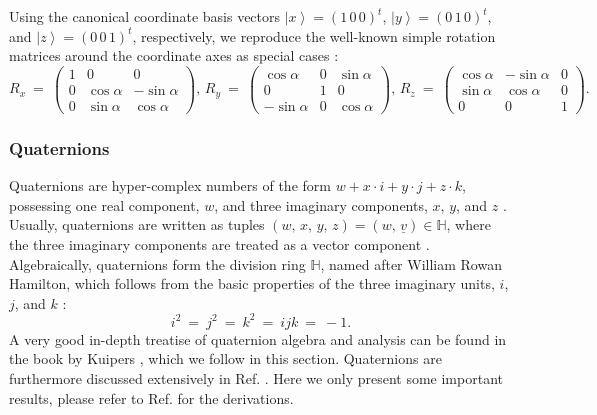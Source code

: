 Using the canonical coordinate basis vectors $\left| x \right> = \left( 1\,0\,0 \right)^t$, $\left| y \right> = \left( 0\,1\,0 \right)^t$,
and $\left| z \right> = \left( 0\,0\,1 \right)^t$, respectively, we reproduce the well-known simple rotation matrices around the
coordinate axes as special cases \cite[p. 238]{Bronstein2008}:
\begin{equation}
	R_x \ =\ 
		\left( \begin{array}{ccc} 
			1 &            0 &            0  \\
			0 &  \cos \alpha & -\sin \alpha  \\
			0 & \sin \alpha  &  \cos \alpha
		\end{array} \right),\,
	R_y \ =\ 
		\left( \begin{array}{ccc} 
			  \cos \alpha &         0 &  \sin \alpha \\
			           0  &         1 &            0 \\
			-\sin \alpha  &         0 &  \cos \alpha
		\end{array} \right),\,
	R_z \ =\ 
		\left( \begin{array}{ccc} 
			 \cos \alpha & -\sin \alpha &             0  \\
			\sin \alpha  &  \cos \alpha &             0  \\
			           0 &            0 &             1
		\end{array} \right).
\end{equation}


\subsubsection{Quaternions}
Quaternions are hyper-complex numbers of the form $w + x \cdot i + y \cdot j + z \cdot k$, possessing one real 
component, $w$, and three imaginary components, $x$, $y$, and $z$ \cite[pp. 294-295]{Bronstein2008}.
Usually, quaternions are written as tuples $\left( w,\,x,\,y,\,z \right) = \left( w,\,\underline{v} \right) \in \mathbb{H}$,
where the three imaginary components are treated as a vector component \cite[p. 295]{Bronstein2008}.
Algebraically, quaternions form the division ring $\mathbb{H}$, named after William Rowan Hamilton, which follows from the 
basic properties of the three imaginary units, $i$, $j$, and $k$ \cite[p. 103]{Kuipers2002}:
\begin{equation}
	i^2 \ =\ j^2 \ =\ k^2 \ =\ ijk \ =\ -1.
	\label{eq:quat_basic}
\end{equation}
A very good in-depth treatise of quaternion algebra and analysis can be found in the book by Kuipers \cite{Kuipers2002},
which we follow in this section. Quaternions are furthermore discussed extensively in Ref. \cite[pp. 294-311]{Bronstein2008}.
Here we only present some important results, please refer to Ref. \cite{Kuipers2002} for the derivations.

